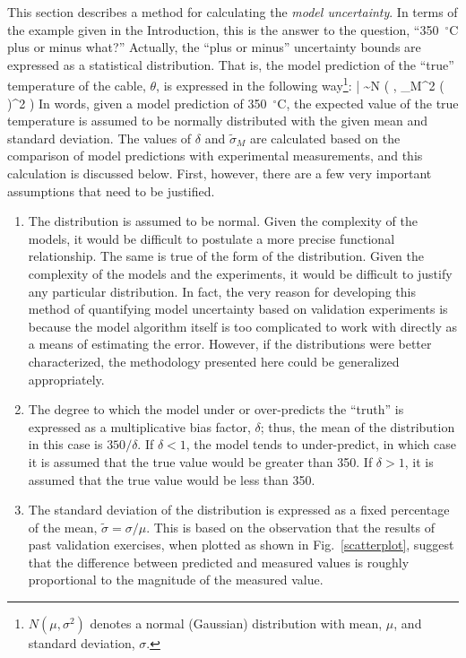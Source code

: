 This section describes a method for calculating the {\em model uncertainty}. In terms of the example given in the Introduction, this
is the answer to the question, ``350~$^\circ$C plus or minus what?'' Actually, the ``plus or minus'' uncertainty bounds are expressed as a statistical distribution.
That is, the model prediction of the ``true'' temperature of the cable, $\theta$, is expressed in the
following way\footnote{$N(\mu,\sigma^2)$ denotes a normal (Gaussian) distribution
with mean, $\mu$, and standard deviation, $\sigma$.}:
\be
   \theta \; |  \sim N \left(  \; , \; \widetilde{\sigma}_M^2
   \left(  \right)^2 \right) \label{truthexample}
\ee
In words, given a model prediction of 350~$^\circ$C, the expected value of the true temperature is assumed to be normally distributed
with the given mean and standard deviation. The values of $\delta$ and $\widetilde{\sigma}_M$ are calculated based on the
comparison of model predictions with experimental measurements, and this calculation is discussed below. First, however,
there are a few very important assumptions that need to be justified.
\begin{enumerate}
\item The distribution is assumed to be normal. Given the
complexity of the models, it would be difficult to postulate a more precise functional relationship.
The same is true of the form of the distribution. Given the complexity of the models and the experiments,
it would be difficult to justify
any particular distribution. In fact, the very reason for developing this method of quantifying model
uncertainty based on validation
experiments is because the model algorithm itself is too complicated to work with directly
as a means of estimating the error. However, if
the distributions were better characterized, the methodology presented here could be generalized appropriately.
\item The degree to which the model under or over-predicts the ``truth'' is expressed as a multiplicative bias factor, $\delta$; thus,
the mean of the distribution in this case is $350/\delta$. If $\delta<1$, the model tends to under-predict, in which case it is
assumed that the true value would be greater than 350. If $\delta>1$, it is assumed that the true value would be less than 350.
\item The standard deviation of the distribution is expressed as a fixed percentage of the mean,
$\widetilde{\sigma}=\sigma/\mu$. This is based on the observation that the results of past validation exercises,
when plotted as shown in Fig.~\ref{scatterplot}, suggest
that the difference between predicted and measured values is roughly proportional to the magnitude of the measured value.
\end{enumerate}

